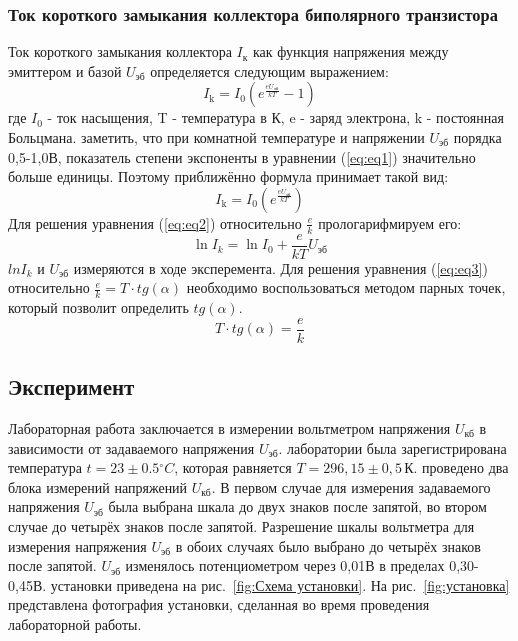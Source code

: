 \subsubsection{Ток короткого замыкания коллектора биполярного транзистора}
Ток короткого замыкания коллектора $I_{к}$ как функция напряжения
между эмиттером и базой $U_{эб}$ определяется следующим выражением:
\begin{equation}
    I_{\mathrm{k}} = I_{0} \left(e^{\frac{e U_{\text{эб}}}{k T}} - 1\right)
    \label{eq:eq1}
\end{equation}
где $I_{0}$ - ток насыщения, T - температура в К, e - заряд электрона, k - постоянная Больцмана.
 заметить, что при комнатной температуре и напряжении $U_{эб}$ порядка 0,5-1,0В, показатель степени экспоненты в уравнении (\ref{eq:eq1}) значительно больше единицы. Поэтому приближённо формула принимает такой вид:
\begin{equation}
    I_{\mathrm{k}} = I_{0} \left(e^{\frac{e U_{\text{эб}}}{k T}}\right)
    \label{eq:eq2}
\end{equation}
Для решения уравнения (\ref{eq:eq2}) относительно $\frac{e}{k}$ прологарифмируем его:
\begin{equation}
    \ln I_k = \ln I_0 + \frac{e}{k T} U_{\text{эб}}
    \label{eq:eq3}
\end{equation}
 $ln I_k$ и $U_{\text{эб}}$ измеряются в ходе эксперемента. Для решения уравнения (\ref{eq:eq3}) относительно $\frac{e}{k}=T\cdot tg(\alpha)$ необходимо воспользоваться методом парных точек, который позволит определить $tg(\alpha)$.
\begin{equation}
    T\cdot tg(\alpha)=\frac{e}{k}
    \label{eq:eq4}
\end{equation}
\subsection{Эксперимент}
Лабораторная работа заключается в измерении вольтметром напряжения  $U_{\text{кб}}$ в зависимости от задаваемого напряжения $U_{\text{эб}}$.
 лаборатории была зарегистрирована температура $t = {23 \pm 0.5}{^\circ}C$, которая равняется $T = 296{,}15\pm 0{,}5\,\text{К}$.
 проведено два блока измерений напряжений $U_{\text{кб}}$. В первом случае для измерения задаваемого напряжения $U_{\text{эб}}$ была выбрана шкала до двух знаков после запятой, во втором случае до четырёх знаков после запятой. Разрешение шкалы вольтметра для измерения напряжения $U_{\text{эб}}$ в обоих случаях было выбрано до четырёх знаков после запятой. 
 $U_{\text{эб}}$ изменялось потенциометром  через 0,01В в пределах 0,30-0,45В.
 установки приведена на рис.~\ref{fig:Схема установки}. На рис.~\ref{fig:установка} представлена фотография установки, сделанная во время проведения лабораторной работы.

